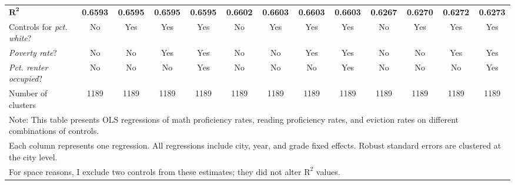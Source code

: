 \begin{table}[htbp]
\begin{tabular}{l*{12}{c}}
$\mathbf{R^2}$      &\textbf{   0.6593}&\textbf{   0.6595}&\textbf{   0.6595}&\textbf{   0.6595}&\textbf{   0.6602}&\textbf{   0.6603}&\textbf{   0.6603}&\textbf{   0.6603}&\textbf{   0.6267}&\textbf{   0.6270}&\textbf{   0.6272}&\textbf{   0.6273}\\
Controls for \emph{pct. white}?&          No&         Yes&         Yes&         Yes&          No&         Yes&         Yes&         Yes&          No&         Yes&         Yes&         Yes\\
\emph{Poverty rate}?&          No&          No&         Yes&         Yes&          No&          No&         Yes&         Yes&          No&          No&         Yes&         Yes\\
\emph{Pct. renter occupied}?&          No&          No&          No&         Yes&          No&          No&          No&         Yes&          No&          No&          No&         Yes\\
Number of clusters  &        1189&        1189&        1189&        1189&        1189&        1189&        1189&        1189&        1189&        1189&        1189&        1189\\
\bottomrule
\multicolumn{13}{l}{\footnotesize Note: This table presents OLS regressions of math proficiency rates, reading proficiency rates, and eviction rates on different combinations of controls.}\\
\multicolumn{13}{l}{\footnotesize  Each column represents one regression. All regressions include city, year, and grade fixed effects. Robust standard errors are clustered at the city level. }\\
\multicolumn{13}{l}{\footnotesize For space reasons, I exclude two controls from these estimates; they did not alter $\text{R}^2$ values.}\\
\end{tabular}
\end{table}
